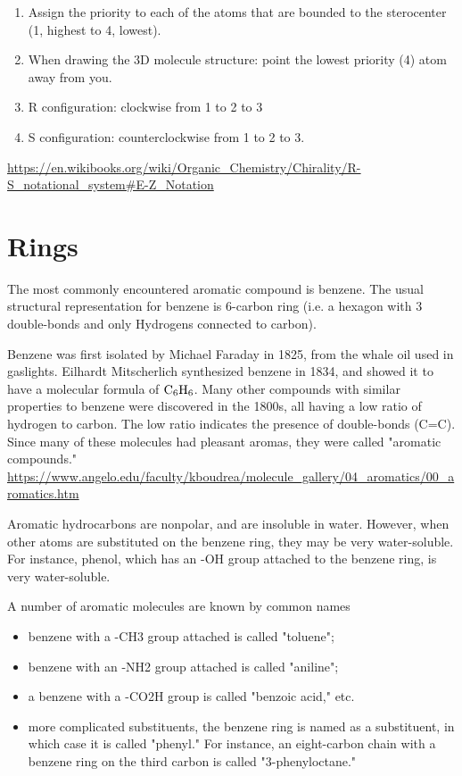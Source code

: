 \begin{enumerate}
  \item Assign the priority to each of the atoms that are bounded to the
  sterocenter (1, highest to 4, lowest).
  
  
  
  \item  When drawing the 3D molecule structure: point the lowest priority (4)
  atom away from you.
  
  \item R configuration: clockwise from 1 to 2 to 3
  
  \item S configuration: counterclockwise from 1 to 2 to 3.
\end{enumerate}
\url{https://en.wikibooks.org/wiki/Organic_Chemistry/Chirality/R-S_notational_system#E-Z_Notation}


\section{Rings}
\label{sec:benzen}
\label{sec:aromatic-ring}

The most commonly encountered aromatic compound is benzene. The usual structural
representation for benzene is 6-carbon ring (i.e. a hexagon with 3
double-bonds and only Hydrogens connected to carbon).

Benzene was first isolated by Michael Faraday in 1825, from the whale oil used
in gaslights. Eilhardt Mitscherlich synthesized benzene in 1834, and showed it
to have a molecular formula of $\ce{C6H6}$.  
Many other compounds with similar properties to benzene were discovered in the
1800s, all having a low ratio of hydrogen to carbon. The low ratio indicates the
presence of double-bonds (C=C).
Since many of these molecules had pleasant aromas, they were called "aromatic
compounds." 
\url{https://www.angelo.edu/faculty/kboudrea/molecule_gallery/04_aromatics/00_aromatics.htm} 

Aromatic hydrocarbons are nonpolar, and are insoluble in water.  However, when
other atoms are substituted on the benzene ring, they may be very water-soluble.
 For instance, phenol, which has an -OH group attached to the benzene ring, is
very water-soluble.

A number of aromatic molecules are known by common names
\begin{itemize} 
  \item benzene with a -CH3 group attached is called "toluene"; 
  
  \item benzene with an -NH2 group attached is called "aniline"; 
  
  \item a benzene with a -CO2H group is called "benzoic acid," etc.
  
  \item  more complicated substituents, the benzene ring is named as a
  substituent, in which case it is called "phenyl."  For instance, an
  eight-carbon chain with a benzene ring on the third carbon is called
  "3-phenyloctane."
  
  
\end{itemize}


